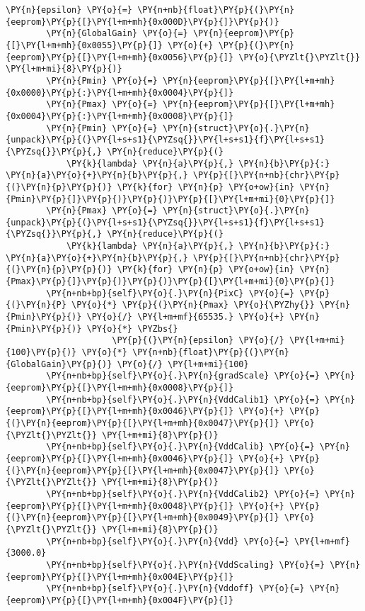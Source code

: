 \begin{tcolorbox}[breakable, size=fbox, boxrule=1pt, pad at break*=1mm,colback=cellbackground, colframe=cellborder]
\begin{Verbatim}[commandchars=\\\{\}]
		\PY{n}{epsilon} \PY{o}{=} \PY{n+nb}{float}\PY{p}{(}\PY{n}{eeprom}\PY{p}{[}\PY{l+m+mh}{0x000D}\PY{p}{]}\PY{p}{)}
		\PY{n}{GlobalGain} \PY{o}{=} \PY{n}{eeprom}\PY{p}{[}\PY{l+m+mh}{0x0055}\PY{p}{]} \PY{o}{+} \PY{p}{(}\PY{n}{eeprom}\PY{p}{[}\PY{l+m+mh}{0x0056}\PY{p}{]} \PY{o}{\PYZlt{}\PYZlt{}} \PY{l+m+mi}{8}\PY{p}{)}
		\PY{n}{Pmin} \PY{o}{=} \PY{n}{eeprom}\PY{p}{[}\PY{l+m+mh}{0x0000}\PY{p}{:}\PY{l+m+mh}{0x0004}\PY{p}{]}
		\PY{n}{Pmax} \PY{o}{=} \PY{n}{eeprom}\PY{p}{[}\PY{l+m+mh}{0x0004}\PY{p}{:}\PY{l+m+mh}{0x0008}\PY{p}{]}
		\PY{n}{Pmin} \PY{o}{=} \PY{n}{struct}\PY{o}{.}\PY{n}{unpack}\PY{p}{(}\PY{l+s+s1}{\PYZsq{}}\PY{l+s+s1}{f}\PY{l+s+s1}{\PYZsq{}}\PY{p}{,} \PY{n}{reduce}\PY{p}{(}
		    \PY{k}{lambda} \PY{n}{a}\PY{p}{,} \PY{n}{b}\PY{p}{:} \PY{n}{a}\PY{o}{+}\PY{n}{b}\PY{p}{,} \PY{p}{[}\PY{n+nb}{chr}\PY{p}{(}\PY{n}{p}\PY{p}{)} \PY{k}{for} \PY{n}{p} \PY{o+ow}{in} \PY{n}{Pmin}\PY{p}{]}\PY{p}{)}\PY{p}{)}\PY{p}{[}\PY{l+m+mi}{0}\PY{p}{]}
		\PY{n}{Pmax} \PY{o}{=} \PY{n}{struct}\PY{o}{.}\PY{n}{unpack}\PY{p}{(}\PY{l+s+s1}{\PYZsq{}}\PY{l+s+s1}{f}\PY{l+s+s1}{\PYZsq{}}\PY{p}{,} \PY{n}{reduce}\PY{p}{(}
		    \PY{k}{lambda} \PY{n}{a}\PY{p}{,} \PY{n}{b}\PY{p}{:} \PY{n}{a}\PY{o}{+}\PY{n}{b}\PY{p}{,} \PY{p}{[}\PY{n+nb}{chr}\PY{p}{(}\PY{n}{p}\PY{p}{)} \PY{k}{for} \PY{n}{p} \PY{o+ow}{in} \PY{n}{Pmax}\PY{p}{]}\PY{p}{)}\PY{p}{)}\PY{p}{[}\PY{l+m+mi}{0}\PY{p}{]}
		\PY{n+nb+bp}{self}\PY{o}{.}\PY{n}{PixC} \PY{o}{=} \PY{p}{(}\PY{n}{P} \PY{o}{*} \PY{p}{(}\PY{n}{Pmax} \PY{o}{\PYZhy{}} \PY{n}{Pmin}\PY{p}{)} \PY{o}{/} \PY{l+m+mf}{65535.} \PY{o}{+} \PY{n}{Pmin}\PY{p}{)} \PY{o}{*} \PYZbs{}
		             \PY{p}{(}\PY{n}{epsilon} \PY{o}{/} \PY{l+m+mi}{100}\PY{p}{)} \PY{o}{*} \PY{n+nb}{float}\PY{p}{(}\PY{n}{GlobalGain}\PY{p}{)} \PY{o}{/} \PY{l+m+mi}{100}
		\PY{n+nb+bp}{self}\PY{o}{.}\PY{n}{gradScale} \PY{o}{=} \PY{n}{eeprom}\PY{p}{[}\PY{l+m+mh}{0x0008}\PY{p}{]}
		\PY{n+nb+bp}{self}\PY{o}{.}\PY{n}{VddCalib1} \PY{o}{=} \PY{n}{eeprom}\PY{p}{[}\PY{l+m+mh}{0x0046}\PY{p}{]} \PY{o}{+} \PY{p}{(}\PY{n}{eeprom}\PY{p}{[}\PY{l+m+mh}{0x0047}\PY{p}{]} \PY{o}{\PYZlt{}\PYZlt{}} \PY{l+m+mi}{8}\PY{p}{)}
		\PY{n+nb+bp}{self}\PY{o}{.}\PY{n}{VddCalib} \PY{o}{=} \PY{n}{eeprom}\PY{p}{[}\PY{l+m+mh}{0x0046}\PY{p}{]} \PY{o}{+} \PY{p}{(}\PY{n}{eeprom}\PY{p}{[}\PY{l+m+mh}{0x0047}\PY{p}{]} \PY{o}{\PYZlt{}\PYZlt{}} \PY{l+m+mi}{8}\PY{p}{)}
		\PY{n+nb+bp}{self}\PY{o}{.}\PY{n}{VddCalib2} \PY{o}{=} \PY{n}{eeprom}\PY{p}{[}\PY{l+m+mh}{0x0048}\PY{p}{]} \PY{o}{+} \PY{p}{(}\PY{n}{eeprom}\PY{p}{[}\PY{l+m+mh}{0x0049}\PY{p}{]} \PY{o}{\PYZlt{}\PYZlt{}} \PY{l+m+mi}{8}\PY{p}{)}
		\PY{n+nb+bp}{self}\PY{o}{.}\PY{n}{Vdd} \PY{o}{=} \PY{l+m+mf}{3000.0}
		\PY{n+nb+bp}{self}\PY{o}{.}\PY{n}{VddScaling} \PY{o}{=} \PY{n}{eeprom}\PY{p}{[}\PY{l+m+mh}{0x004E}\PY{p}{]}
		\PY{n+nb+bp}{self}\PY{o}{.}\PY{n}{Vddoff} \PY{o}{=} \PY{n}{eeprom}\PY{p}{[}\PY{l+m+mh}{0x004F}\PY{p}{]}


\end{Verbatim}
\end{tcolorbox}
